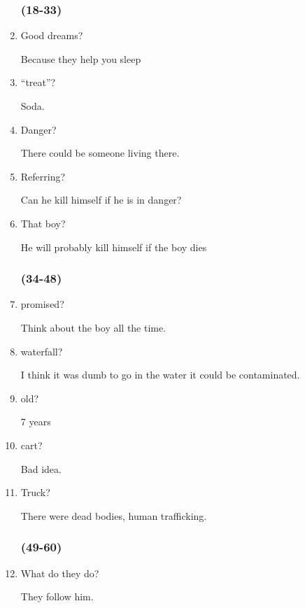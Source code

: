 \begin{multicols}{3}
\begin{enumerate}
    \subsubsection{(18-33)}

    \item Good dreams?

    Because they help you sleep

    \item “treat”?

    Soda.

    \item  Danger?

    There could be someone living there.

    \item Referring?

    Can he kill himself if he is in danger?

    \item That boy?

    He will probably kill himself if the boy dies

    \subsubsection{(34-48)}

    \item promised?

    Think about the boy all the time.

    \item waterfall?

    I think it was dumb to go in the water it could be contaminated.

    \item old?

    7 years

    \item cart?

    Bad idea.

    \item Truck?

    There were dead bodies, human trafficking.

    \subsubsection{(49-60)}

    \item What do they do?

    They follow him.


\end{enumerate}
\end{multicols}
